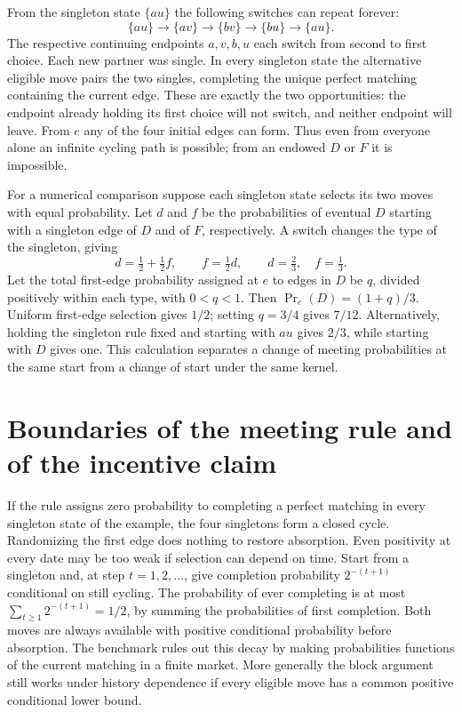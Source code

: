 \documentclass[11pt]{article}
\begin{document}
From the singleton state \(\{au\}\) the following switches can repeat forever:
\[
 \{au\}\longrightarrow\{av\}\longrightarrow\{bv\}
 \longrightarrow\{bu\}\longrightarrow\{au\}.
\]
The respective continuing endpoints \(a,v,b,u\) each switch from second to first choice. Each new partner was single. In every singleton state the alternative eligible move pairs the two singles, completing the unique perfect matching containing the current edge. These are exactly the two opportunities: the endpoint already holding its first choice will not switch, and neither endpoint will leave. From \(e\) any of the four initial edges can form. Thus even from everyone alone an infinite cycling path is possible; from an endowed \(D\) or \(F\) it is impossible.

For a numerical comparison suppose each singleton state selects its two moves with equal probability. Let \(d\) and \(f\) be the probabilities of eventual \(D\) starting with a singleton edge of \(D\) and of \(F\), respectively. A switch changes the type of the singleton, giving
\[
 d=\tfrac12+\tfrac12 f,\qquad f=\tfrac12 d,\qquad
 d=\tfrac23,\quad f=\tfrac13 .
\]
Let the total first-edge probability assigned at \(e\) to edges in \(D\) be \(q\), divided positively within each type, with \(0<q<1\). Then \(\Pr_e(D)=(1+q)/3\). Uniform first-edge selection gives \(1/2\); setting \(q=3/4\) gives \(7/12\). Alternatively, holding the singleton rule fixed and starting with \(au\) gives \(2/3\), while starting with \(D\) gives one. This calculation separates a change of meeting probabilities at the same start from a change of start under the same kernel.

\section{Boundaries of the meeting rule and of the incentive claim}\label{sec:limits}

If the rule assigns zero probability to completing a perfect matching in every singleton state of the example, the four singletons form a closed cycle. Randomizing the first edge does nothing to restore absorption. Even positivity at every date may be too weak if selection can depend on time. Start from a singleton and, at step \(t=1,2,\ldots\), give completion probability \(2^{-(t+1)}\) conditional on still cycling. The probability of ever completing is at most \(\sum_{t\geq1}2^{-(t+1)}=1/2\), by summing the probabilities of first completion. Both moves are always available with positive conditional probability before absorption. The benchmark rules out this decay by making probabilities functions of the current matching in a finite market. More generally the block argument still works under history dependence if every eligible move has a common positive conditional lower bound.
\end{document}
